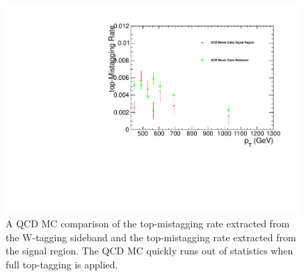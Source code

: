 \begin{figure}[htcb]
\centering
\includegraphics[width=1.0\textwidth]{AN-14-049/figs/qcdtrcomp.pdf}
\caption{ 
A QCD MC comparison of the top-mistagging rate extracted from the W-tagging sideband and the top-mistagging rate extracted from the signal region.  The QCD MC quickly runs out of statistics when 
full top-tagging is applied.}
\label{figs:bsqcdtr}
\end{figure} 



